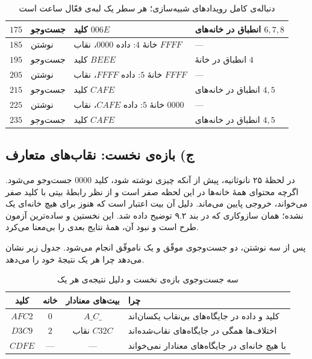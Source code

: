 \documentclass[12pt,a4paper]{article}
\begin{document}
\begin{table}[H]
\begin{tabular}{|c|l|l|l|}
			\(175\) & جست‌وجو & کلید \(006E\)                       & انطباق در خانه‌های \(6,7,8\) \\ \hline
			\(185\) & نوشتن   & خانهٔ \(4\): داده \(0000\)، نقاب \(FFFF\) & --- \\ \hline
			\(195\) & جست‌وجو & کلید \(BEEE\)                       & انطباق در خانهٔ \(4\) \\ \hline
			\(205\) & نوشتن   & خانهٔ \(5\): داده \(FFFF\)، نقاب \(FFFF\) & --- \\ \hline
			\(215\) & جست‌وجو & کلید \(CAFE\)                       & انطباق در خانه‌های \(4,5\) \\ \hline
			\(225\) & نوشتن   & خانهٔ \(5\): داده \(CAFE\)، نقاب \(0000\) & --- \\ \hline
			\(235\) & جست‌وجو & کلید \(CAFE\)                       & انطباق در خانه‌های \(4,5\) \\ \hline
		\end{tabular}
		\caption{دنباله‌ی کامل رویدادهای شبیه‌سازی؛ هر سطر یک لبه‌ی فعّال ساعت است}
	\end{table}

	\subsection*{ج) بازه‌ی نخست: نقاب‌های متعارف}

	در لحظهٔ ۲۵ نانوثانیه، پیش از آنکه چیزی نوشته شود، کلید \(0000\) جست‌وجو می‌شود. اگرچه محتوای همهٔ خانه‌ها در این لحظه صفر است و از نظر رابطهٔ بیتی با کلید صفر می‌خواند، خروجی  پایین می‌ماند. دلیل آن بیت اعتبار است که هنوز برای هیچ خانه‌ای یک نشده؛ همان سازوکاری که در بند ۹.۲ توضیح داده شد. این نخستین و ساده‌ترین آزمون طرح است و نبود آن، همهٔ نتایج بعدی را بی‌معنا می‌کرد.

	پس از سه نوشتن، دو جست‌وجوی موفّق و یک ناموفّق انجام می‌شود. جدول زیر نشان می‌دهد چرا هر یک نتیجهٔ خود را می‌دهد.

	\begin{table}[H]
		\centering
		\footnotesize
		\begin{tabular}{|c|c|c|l|}
			\hline
			\textbf{کلید} & \textbf{خانه} & \textbf{بیت‌های معنادار} & \textbf{چرا} \\ \hline
			\(AFC2\) & \(0\) & \(A\_C\_\) & کلید و داده در جایگاه‌های بی‌نقاب یکسان‌اند \\ \hline
			\(D3C9\) & \(2\) & نقاب \(C32C\) & اختلاف‌ها همگی در جایگاه‌های نقاب‌شده‌اند \\ \hline
			\(CDFE\) & --- & --- & با هیچ خانه‌ای در جایگاه‌های معنادار نمی‌خواند \\ \hline
		\end{tabular}
		\caption{سه جست‌وجوی بازه‌ی نخست و دلیل نتیجه‌ی هر یک}
	\end{table}
\end{document}

